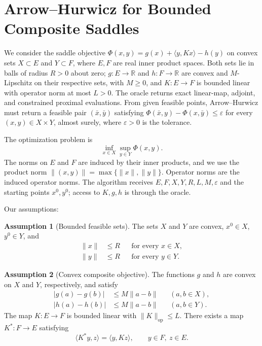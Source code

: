 \documentclass[10pt]{article}
\theoremstyle{definition}
\newtheorem{assumption}{Assumption}
\begin{document}
\section*{Arrow--Hurwicz for Bounded Composite Saddles}
We consider the saddle objective $\Phi(x,y)=g(x)+\langle y,Kx\rangle-h(y)$ on convex sets $X\subset E$ and $Y\subset F$, where $E,F$ are real inner product spaces. Both sets lie in balls of radius $R>0$ about zero; $g:E\to\mathbb{R}$ and $h:F\to\mathbb{R}$ are convex and $M$-Lipschitz on their respective sets, with $M\geq0$, and $K:E\to F$ is bounded linear with operator norm at most $L>0$. The oracle returns exact linear-map, adjoint, and constrained proximal evaluations. From given feasible points, Arrow--Hurwicz must return a feasible pair $(\bar{x},\bar{y})$ satisfying $\Phi(\bar{x},y)-\Phi(x,\bar{y})\leq\varepsilon$ for every $(x,y)\in X\times Y$, almost surely, where $\varepsilon>0$ is the tolerance.

The optimization problem is
\[
\inf_{x\in X}\sup_{y\in Y}\Phi(x,y).
\]
The norms on $E$ and $F$ are induced by their inner products, and we use the product norm $\|(x,y)\|=\max\{\|x\|,\|y\|\}$. Operator norms are the induced operator norms. The algorithm receives $E,F,X,Y,R,L,M,\varepsilon$ and the starting points $x^0,y^0$; access to $K,g,h$ is through the oracle.

Our assumptions:
\begin{assumption}[Bounded feasible sets]
The sets $X$ and $Y$ are convex, $x^0\in X$, $y^0\in Y$, and
\[
\begin{aligned}
\|x\|&\leq R &&\text{for every }x\in X,\\
\|y\|&\leq R &&\text{for every }y\in Y.
\end{aligned}
\]
\end{assumption}

\begin{assumption}[Convex composite objective]
The functions $g$ and $h$ are convex on $X$ and $Y$, respectively, and satisfy
\[
\begin{aligned}
|g(a)-g(b)|&\leq M\|a-b\| &&(a,b\in X),\\
|h(a)-h(b)|&\leq M\|a-b\| &&(a,b\in Y).
\end{aligned}
\]
The map $K:E\to F$ is bounded linear with $\|K\|_{\mathrm{op}}\leq L$. There exists a map $K^*:F\to E$ satisfying
\[
\langle K^*y,z\rangle=\langle y,Kz\rangle,
\qquad y\in F,\ z\in E.
\]
\end{assumption}
\end{document}
